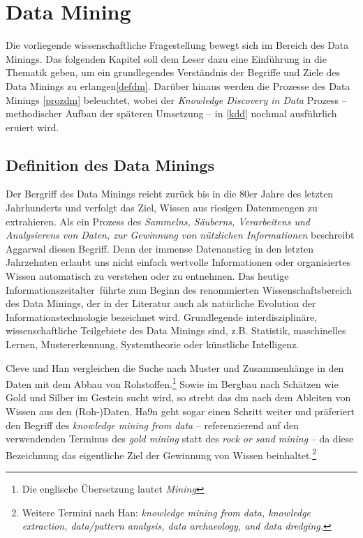 \section{Data Mining}
\label{dm}
Die vorliegende wissenschaftliche Fragestellung bewegt sich im Bereich des Data Minings. Das folgenden Kapitel soll dem Leser dazu eine Einführung in die Thematik geben, um ein grundlegendes Verständnis der Begriffe und Ziele des Data Minings zu erlangen\vref{defdm}. Darüber hinaus werden die Prozesse des Data Minings \vref{prozdm} beleuchtet, wobei der \textit{Knowledge Discovery in Data} Prozess -- methodischer Aufbau der späteren Umsetzung -- in \vref{kdd} nochmal ausführlich eruiert wird.

\subsection{Definition des Data Minings}
\label{defdm}

Der Bergriff des Data Minings reicht zurück bis in die 80er Jahre des letzten Jahrhunderts und verfolgt das Ziel, Wissen aus riesigen Datenmengen zu extrahieren. Als ein Prozess des \textit{Sammelns, Säuberns, Verarbeitens und Analysierens von Daten, zur Gewinnung von nützlichen Informationen} beschreibt Aggarwal diesen Begriff. Denn der immense Datenanstieg in den letzten Jahrzehnten erlaubt uns nicht einfach wertvolle Informationen oder organisiertes Wissen automatisch zu verstehen oder zu entnehmen. Das heutige \glqq Informationszeitalter\grqq~führte zum Beginn des renommierten Wissenschaftsbereich des Data Minings, der in der Literatur auch als natürliche Evolution der Informationstechnologie bezeichnet wird. Grundlegende interdisziplinäre, wissenschaftliche Teilgebiete des Data Minings sind, z.B. Statistik, maschinelles Lernen, Mustererkennung, Systemtheorie oder künstliche Intelligenz.


Cleve und Han vergleichen die Suche nach Muster und Zusammenhänge in den Daten mit dem Abbau von Rohstoffen.\footnote{Die englische Übersetzung lautet \textit{\glqq Mining\grqq}} Sowie im Bergbau nach Schätzen wie Gold und Silber im Gestein sucht wird, so strebt das \gls{dm} nach dem Ableiten von Wissen aus den (Roh-)Daten. Ha9n geht sogar einen Schritt weiter und präferiert den Begriff des \textit{knowledge mining from data} -- referenzierend auf den verwendenden Terminus des \textit{gold mining} statt des \textit{rock or sand mining} -- da diese Bezeichnung das eigentliche Ziel der Gewinnung von Wissen beinhaltet.\footnote{Weitere Termini nach Han: \textit{knowledge mining from data, knowledge extraction, data/pattern analysis, data archaeology, and data dredging.}}

